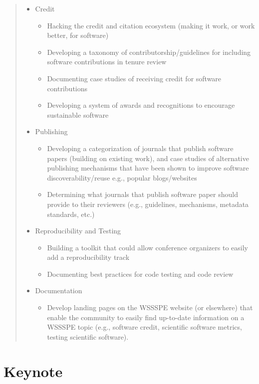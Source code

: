\documentclass[11pt, oneside]{amsart}
\newcommand{\note}[1]{ {\textcolor{blueish}    { ***Note:      #1 }}}
\begin{document}
\begin{quote}
\begin{itemize}
\item Credit
\begin{itemize}
\item Hacking the credit and citation ecosystem (making it work, or work better,
for software)
\item Developing a taxonomy of contributorship/guidelines for including software
contributions in tenure review
\item Documenting case studies of receiving credit for software contributions
\item Developing a system of awards and recognitions to encourage sustainable software
\end{itemize}

\item Publishing
\begin{itemize}
\item Developing a categorization of journals that publish software papers
(building on existing work), and case studies of alternative publishing
mechanisms that have been shown to improve software discoverability/reuse e.g.,
popular blogs/websites
\item Determining what journals that publish software paper should provide to
their reviewers (e.g., guidelines, mechanisms, metadata standards, etc.)
\end{itemize}

\item Reproducibility and Testing
\begin{itemize}
\item Building a toolkit that could allow conference organizers to easily add a
reproducibility track
\item Documenting best practices for code testing and code review
\end{itemize}

\item Documentation
\begin{itemize}
\item Develop landing pages on the WSSSPE website (or elsewhere) that enable the
community to easily find up-to-date information on a WSSSPE topic (e.g.,
software credit, scientific software metrics, testing scientific software).
\end{itemize}

\end{itemize}
\end{quote}

\section{Keynote \label{sec:keynote}}
\end{document}
